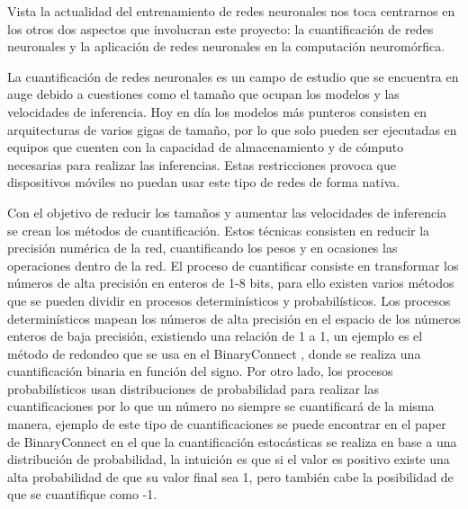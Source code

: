 Vista la actualidad del entrenamiento de redes neuronales nos toca centrarnos en los otros dos aspectos que involucran este proyecto: la cuantificación de redes neuronales y la aplicación de redes neuronales en la computación neuromórfica.

La cuantificación de redes neuronales es un campo de estudio que se encuentra en auge debido a cuestiones como el tamaño que ocupan los modelos y las velocidades de inferencia. Hoy en día los modelos más punteros consisten en arquitecturas de varios gigas de tamaño, por lo que solo pueden ser ejecutadas en equipos que cuenten con la capacidad de almacenamiento y de cómputo necesarias para realizar las inferencias. Estas restricciones provoca que dispositivos móviles no puedan usar este tipo de redes de forma nativa. 

Con el objetivo de reducir los tamaños y aumentar las velocidades de inferencia se crean los métodos de cuantificación. Estos técnicas consisten en reducir la precisión numérica de la red, cuantificando los pesos y en ocasiones las operaciones dentro de la red. El proceso de cuantificar consiste en transformar los números de alta precisión en enteros de 1-8 bits, para ello existen varios métodos que se pueden dividir en procesos determinísticos y probabilísticos. Los procesos determinísticos mapean los números de alta precisión en el espacio de los números enteros de baja precisión, existiendo una relación de 1 a 1, un ejemplo es el método de redondeo que se usa en el BinaryConnect \cite{10.5555/2969442.2969588}, donde se realiza una cuantificación binaria en función del signo. Por otro lado, los procesos probabilísticos usan distribuciones de probabilidad para realizar las cuantificaciones por lo que un número no siempre se cuantificará de la misma manera, ejemplo de este tipo de cuantificaciones se puede encontrar en el paper de BinaryConnect en el que la cuantificación estocásticas se realiza en base a una distribución de probabilidad, la intuición es que si el valor es positivo existe una alta probabilidad de que su valor final sea 1, pero también cabe la posibilidad de que se cuantifique como -1. 

